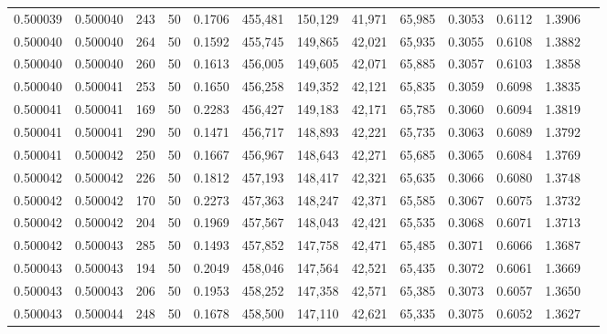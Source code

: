 \begin{tabular}{rrrrrrrrrrrrr}
0.500039 & 0.500040 &   243 &  50 &                                     0.1706 & 455,481 & 150,129 &  41,971 &  65,985 & 0.3053 & 0.6112 & 1.3906 \\
0.500040 & 0.500040 &   264 &  50 &                                     0.1592 & 455,745 & 149,865 &  42,021 &  65,935 & 0.3055 & 0.6108 & 1.3882 \\
0.500040 & 0.500040 &   260 &  50 &                                     0.1613 & 456,005 & 149,605 &  42,071 &  65,885 & 0.3057 & 0.6103 & 1.3858 \\
0.500040 & 0.500041 &   253 &  50 &                                     0.1650 & 456,258 & 149,352 &  42,121 &  65,835 & 0.3059 & 0.6098 & 1.3835 \\
0.500041 & 0.500041 &   169 &  50 &                                     0.2283 & 456,427 & 149,183 &  42,171 &  65,785 & 0.3060 & 0.6094 & 1.3819 \\
0.500041 & 0.500041 &   290 &  50 &                                     0.1471 & 456,717 & 148,893 &  42,221 &  65,735 & 0.3063 & 0.6089 & 1.3792 \\
0.500041 & 0.500042 &   250 &  50 &                                     0.1667 & 456,967 & 148,643 &  42,271 &  65,685 & 0.3065 & 0.6084 & 1.3769 \\
0.500042 & 0.500042 &   226 &  50 &                                     0.1812 & 457,193 & 148,417 &  42,321 &  65,635 & 0.3066 & 0.6080 & 1.3748 \\
0.500042 & 0.500042 &   170 &  50 &                                     0.2273 & 457,363 & 148,247 &  42,371 &  65,585 & 0.3067 & 0.6075 & 1.3732 \\
0.500042 & 0.500042 &   204 &  50 &                                     0.1969 & 457,567 & 148,043 &  42,421 &  65,535 & 0.3068 & 0.6071 & 1.3713 \\
0.500042 & 0.500043 &   285 &  50 &                                     0.1493 & 457,852 & 147,758 &  42,471 &  65,485 & 0.3071 & 0.6066 & 1.3687 \\
0.500043 & 0.500043 &   194 &  50 &                                     0.2049 & 458,046 & 147,564 &  42,521 &  65,435 & 0.3072 & 0.6061 & 1.3669 \\
0.500043 & 0.500043 &   206 &  50 &                                     0.1953 & 458,252 & 147,358 &  42,571 &  65,385 & 0.3073 & 0.6057 & 1.3650 \\
0.500043 & 0.500044 &   248 &  50 &                                     0.1678 & 458,500 & 147,110 &  42,621 &  65,335 & 0.3075 & 0.6052 & 1.3627 \\

\end{tabular}
